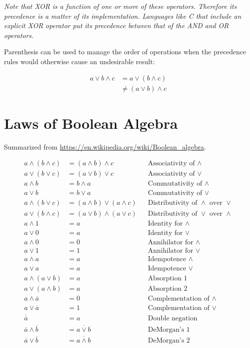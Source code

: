 \documentclass[10pt]{article}
\begin{document}
{\em Note that XOR is a function of one or more of these operators.  
Therefore its precedence is a matter of its implementation.  
Languages like C that include an explicit XOR operator put its 
precedence between that of the AND and OR operators.}

Parenthesis can be used to manage the order of operations when the
precedence rules would otherwise cause an undesirable result:

\begin{align}
a \lor b \land c & = a \lor ( b \land c ) \\
& \neq ( a \lor b ) \land c
\end{align}


\section{Laws of Boolean Algebra}

Summarized from \url{https://en.wikipedia.org/wiki/Boolean_algebra}.

\begin{align}
a \land ( b \land c ) & = ( a \land b ) \land c	&& \text{Associativity of } \land \\
a \lor ( b \lor c ) & = ( a \lor b ) \lor c		&& \text{Associativity of } \lor \\
a \land b & = b \land a							&&  \text{Commutativity of } \land \\
a \lor b & = b \lor a							&&  \text{Commutativity of } \lor \\
a \land ( b \lor c) & = (a \land b) \lor (a \land c) && \text{Distributivity of } \land \text{ over } \lor \\
a \lor ( b \land c) & = (a \lor b) \land (a \lor c) && \text{Distributivity of } \lor \text{ over } \land \\
a \land 1 & = a									&& \text{Identity for } \land \\
a \lor 0 & = a									&& \text{Identity for } \lor \\
a \land 0 & = 0									&& \text{Annihilator for } \land \\
a \lor 1 & = 1									&& \text{Annihilator for } \lor \\
a \land a & = a									&& \text{Idempotence } \land \\
a \lor a & = a									&& \text{Idempotence } \lor \\
a \land ( a \lor b ) & = a						&& \text{Absorption 1} \\
a \lor ( a \land b ) & = a						&& \text{Absorption 2} \\
a \land \overline{a} & = 0						&& \text{Complementation of $\land$} \\
a \lor \overline{a} & = 1						&& \text{Complementation of $\lor$} \\
\overline{\overline{a}} & = a					&& \text{Double negation} \\
\overline{a}\land\overline{b} & = \overline{a\lor b}	&& \text{DeMorgan's 1} \\
\overline{a}\lor\overline{b} & = \overline{a\land b}	&& \text{DeMorgan's 2}
\end{align}
\end{document}
